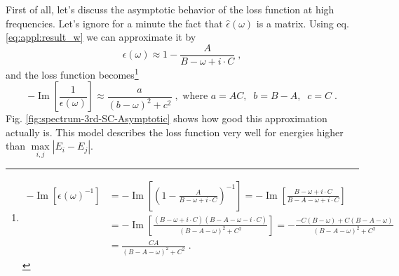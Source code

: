 \documentclass[a4paper,12pt]{article}
\begin{document}
    First of all, let's discuss the asymptotic behavior of the loss function at high frequencies. Let's ignore for a minute the fact that $\hat\epsilon(\omega)$ is a matrix. Using eq. \eqref{eq:appl:result_w} we can approximate it by 
    \begin{equation*}
        \epsilon(\omega) \approx 1 - \frac{A}{B - \omega + i\cdot C} \; ,
    \end{equation*}
    and the loss function becomes\footnote{ %
    \begin{equation*}
        \begin{aligned}
        -\operatorname{Im}[\epsilon(\omega)^{-1}] &= -\operatorname{Im}\left[\left(1 - \frac{A}{B - \omega + i\cdot C}\right)^{-1}\right]
        = -\operatorname{Im}\left[\frac{B - \omega + i\cdot C}{B - A - \omega + i\cdot C}\right] \\
        &= -\operatorname{Im}\left[\frac{(B - \omega + i\cdot C)(B - A - \omega - i\cdot C)}{(B - A - \omega)^2 + C^2}\right]
        = -\frac{-C(B - \omega) + C(B - A - \omega)}{(B - A - \omega)^2 + C^2} \\
        &= \frac{CA}{(B - A - \omega)^2 + C^2} \; .
        \end{aligned}
    \end{equation*}
    } %
    \begin{equation} \label{eq:exp:asymptotic_approx}
        -\operatorname{Im}\left[\frac{1}{\epsilon(\omega)}\right] \approx \frac{a}{(b - \omega)^2 + c^2} \;,\text{ where }a=AC ,\;\; b = B-A ,\;\; c = C\;.
    \end{equation}
    Fig. \ref{fig:spectrum-3rd-SC-Asymptotic} shows how good this approximation actually is. This model describes the loss function very well for energies higher than $\underset{i,j}{\operatorname{max}}|E_i - E_j|$.
\end{document}
